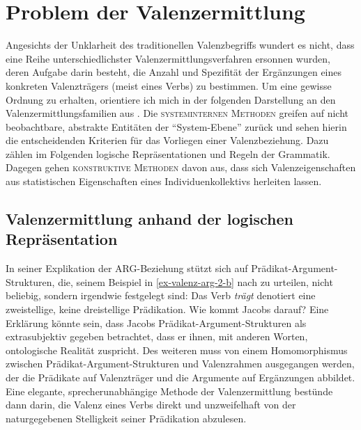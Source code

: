 \section{Problem der Valenzermittlung} \label{sec-valenzermittlung}

Angesichts der Unklarheit des traditionellen Valenzbegriffs wundert es nicht, dass eine Reihe unterschiedlichster Valenzermittlungsverfahren ersonnen wurden, deren Aufgabe darin besteht, die Anzahl und Spezifität der Ergänzungen eines konkreten Valenzträgers (meist eines Verbs) zu bestimmen. Um eine gewisse Ordnung zu erhalten, orientiere ich mich in der folgenden Darstellung an den Valenzermittlungsfamilien aus \citet[7.2.2]{Storrer:92}. Die \textsc{systeminternen Methoden} greifen auf nicht beobachtbare, abstrakte Entitäten der "`System-Ebene"' zurück und sehen hierin die entscheidenden Kriterien für das Vorliegen einer Valenzbeziehung. Dazu zählen im Folgenden logische Repräsentationen und Regeln der Grammatik. Dagegen gehen \textsc{konstruktive Methoden} davon aus, dass sich Valenzeigenschaften aus statistischen Eigenschaften eines Individuenkollektivs herleiten lassen.



\subsection{Valenzermittlung anhand der logischen Repräsentation} 

In seiner Explikation der ARG-Beziehung stützt sich \cite{Jacobs:94} auf Prädikat-Argument-Strukturen, die, seinem Beispiel in \ref{ex-valenz-arg-2-b} nach zu urteilen, nicht beliebig, sondern irgendwie festgelegt sind: Das Verb {\it trägt} denotiert eine zweistellige, keine dreistellige Prädikation. Wie kommt Jacobs darauf? Eine Erklärung könnte sein, dass Jacobs Prädikat-Argument-Strukturen als extrasubjektiv gegeben betrachtet, dass er ihnen, mit anderen Worten, ontologische Realität zuspricht. Des weiteren muss von einem Homomorphismus zwischen Prädikat-Argument-Strukturen und Valenzrahmen ausgegangen werden, der die Prädikate auf Valenzträger und die Argumente auf Ergänzungen abbildet. Eine elegante, sprecherunabhängige Methode der Valenzermittlung bestünde dann darin, die Valenz eines Verbs direkt und unzweifelhaft von der naturgegebenen Stelligkeit seiner Prädikation abzulesen.

